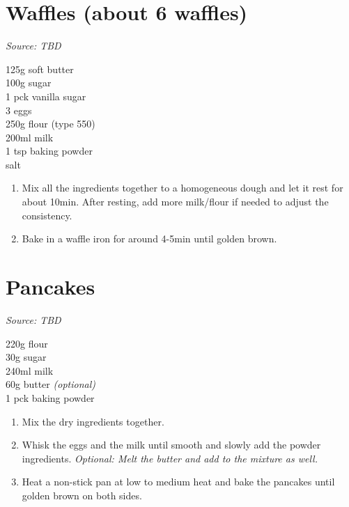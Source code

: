\documentclass{report}
\begin{document}
\section[Waffles]{Waffles (about 6 waffles)}
\textit{Source: TBD}\\
\begin{minipage}[t]{0.21\textwidth} \vspace{0pt}
125g soft butter\\
100g sugar\\
1 pck vanilla sugar\\
3 eggs\\
250g flour (type 550)\\
200ml milk\\
1 tsp baking powder\\
salt
\end{minipage}
\hfill
\begin{minipage}[t]{0.78\textwidth} \vspace{0pt}
	\begin{enumerate}
		\item Mix all the ingredients together to a homogeneous dough and let it rest for about 10min. After resting, add more milk/flour if needed to adjust the consistency.
		\item Bake in a waffle iron for around 4-5min until golden brown.
	\end{enumerate}	
\end{minipage}

\section{Pancakes}
\textit{Source: TBD}\\
\begin{minipage}[t]{0.21\textwidth} \vspace{0pt}
220g flour\\
30g sugar\\
240ml milk\\
60g butter \textit{(optional)}\\
1 pck baking powder
\end{minipage}
\hfill
\begin{minipage}[t]{0.78\textwidth} \vspace{0pt}
	\begin{enumerate}
		\item Mix the dry ingredients together.
		\item Whisk the eggs and the milk until smooth and slowly add the powder ingredients.
		\textit{Optional: Melt the butter and add to the mixture as well.}
		\item Heat a non-stick pan at low to medium heat and bake the pancakes until golden brown on both sides.
	\end{enumerate}	
\end{minipage}
\end{document}
